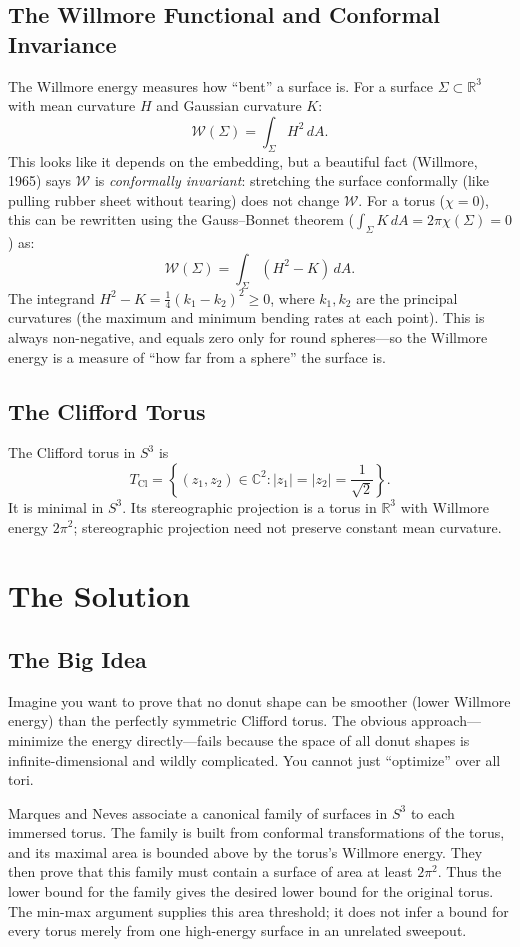 \subsection{The Willmore Functional and Conformal Invariance}
The Willmore energy measures how ``bent'' a surface is. For a surface $\Sigma \subset \mathbb{R}^3$ with mean curvature $H$ and Gaussian curvature $K$:
\[
\mathcal{W}(\Sigma) = \int_\Sigma H^2 \, dA.
\]
This looks like it depends on the embedding, but a beautiful fact (Willmore, 1965) says $\mathcal{W}$ is \emph{conformally invariant}: stretching the surface conformally (like pulling rubber sheet without tearing) does not change $\mathcal{W}$. For a torus ($\chi=0$), this can be rewritten using the Gauss--Bonnet theorem ($\int_\Sigma K \, dA = 2\pi\chi(\Sigma) = 0$) as:
\[
\mathcal{W}(\Sigma) = \int_\Sigma (H^2 - K) \, dA.
\]
The integrand $H^2 - K = \frac{1}{4}(k_1 - k_2)^2 \ge 0$, where $k_1, k_2$ are the principal curvatures (the maximum and minimum bending rates at each point). This is always non-negative, and equals zero only for round spheres---so the Willmore energy is a measure of ``how far from a sphere'' the surface is.

\subsection{The Clifford Torus}
The Clifford torus in $S^3$ is
\[
T_{\text{Cl}} = \left\{ (z_1, z_2) \in \mathbb{C}^2 : |z_1| = |z_2| = \frac{1}{\sqrt{2}} \right\}.
\]
It is minimal in $S^3$. Its stereographic projection is a torus in $\mathbb{R}^3$ with Willmore energy $2\pi^2$; stereographic projection need not preserve constant mean curvature.

\section{The Solution}

\subsection{The Big Idea}

Imagine you want to prove that no donut shape can be smoother (lower Willmore energy) than the perfectly symmetric Clifford torus. The obvious approach---minimize the energy directly---fails because the space of all donut shapes is infinite-dimensional and wildly complicated. You cannot just ``optimize'' over all tori.

Marques and Neves associate a canonical family of surfaces in $S^3$ to each immersed torus. The family is built from conformal transformations of the torus, and its maximal area is bounded above by the torus's Willmore energy. They then prove that this family must contain a surface of area at least $2\pi^2$. Thus the lower bound for the family gives the desired lower bound for the original torus. The min-max argument supplies this area threshold; it does not infer a bound for every torus merely from one high-energy surface in an unrelated sweepout.

